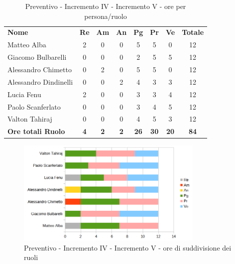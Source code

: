 \begin{table} [h!]
	\begin{center}
		\begin{tabular} { m{3.5cm} c c c c c c c }
			\rowcolor{lightgray}
			\textbf{Nome} & \textbf{Re} & \textbf{Am} & \textbf{An} & \textbf{Pg} & \textbf{Pr} & \textbf{Ve} & \textbf{Totale} \\
			Matteo Alba &2 &0 & 0& 5 &5 & 0 & 12 \\
			Giacomo Bulbarelli & 0 &0 & 0& 2 & 5 & 5 & 12 \\
			Alessandro Chimetto & 0 & 2& 0& 5 & 5 & 0& 12 \\
			Alessandro Dindinelli & 0& 0 & 2& 4 & 3 &3 & 12 \\
			Lucia Fenu & 2 & 0 &0 & 3 & 3 & 4 & 12 \\
			Paolo Scanferlato &0 & 0 &0 & 3 & 4 & 5 & 12\\
			Valton Tahiraj & 0& 0 &0 & 4 & 5 & 3 & 12 \\
			\textbf{Ore totali Ruolo} & \textbf{4} & \textbf{2} & \textbf{2} & \textbf{26} & \textbf{30}& \textbf{20} & \textbf{84}
		\end{tabular}
		\caption{Preventivo - Incremento IV - Incremento V - ore per persona/ruolo}
	\end{center}
\end{table}
\begin{figure} [h!]
	\centering
	\includegraphics[width=0.8\textwidth]{res/img/preventivi/4e5-barre.png}
	\caption{Preventivo - Incremento IV - Incremento V - ore di suddivisione dei ruoli} 
\end{figure}

\newpage

